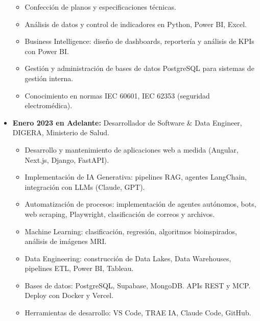 \documentclass[lighthipster]{simplehipstercv}
\begin{document}
\begin{paracol}{2}
\begin{itemize}
\begin{itemize}
        \item Confección de planos y especificaciones técnicas.
        \item Análisis de datos y control de indicadores en Python, Power BI, Excel.
        \item Business Intelligence: diseño de dashboards, reportería y análisis de KPIs con Power BI.
        \item Gestión y administración de bases de datos PostgreSQL para sistemas de gestión interna.
        \item Conocimiento en normas IEC 60601, IEC 62353 (seguridad electromédica).
    \end{itemize}
    \item \textbf{Enero 2023 en Adelante:} Desarrollador de Software \& Data Engineer, DIGERA, Ministerio de Salud.
    \begin{itemize}
        \item Desarrollo y mantenimiento de aplicaciones web a medida (Angular, Next.js, Django, FastAPI).
        \item Implementación de IA Generativa: pipelines RAG, agentes LangChain, integración con LLMs (Claude, GPT).
        \item Automatización de procesos: implementación de agentes autónomos, bots, web scraping, Playwright, clasificación de correos y archivos.
        \item Machine Learning: clasificación, regresión, algoritmos bioinspirados, análisis de imágenes MRI.
        \item Data Engineering: construcción de Data Lakes, Data Warehouses, pipelines ETL, Power BI, Tableau.
        \item Bases de datos: PostgreSQL, Supabase, MongoDB. APIs REST y MCP. Deploy con Docker y Vercel.
        \item Herramientas de desarrollo: VS Code, TRAE IA, Claude Code, GitHub.
    \end{itemize}
\end{itemize}

\vspace{.5em}



\end{paracol}
\end{document}
